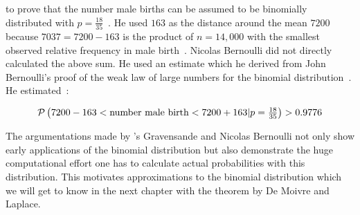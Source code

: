to prove that the number male births can be assumed to be binomially distributed with $p=\tfrac{18}{35}$~\cite[pp. 281-282]{hald1}. He used $163$ as the distance around the mean $7200$ because $7037=7200-163$ is the product of $n=14,000$ with the smallest observed relative frequency in male birth~\cite[p. 282]{hald1}. Nicolas Bernoulli did not directly calculated the above sum. He used an estimate which he derived from John Bernoulli's proof of the weak law of large numbers for the binomial distribution~\cite[pp. 264-267]{hald1}. He estimated~\cite[p. 282]{hald1}:

\begin{align}
    \P{7200-163 < \text{number male birth} < 7200+163|p=\tfrac{18}{35}} > 0.9776
\end{align}

The argumentations made by 's Gravensande and Nicolas Bernoulli not only show early applications of the binomial distribution but also demonstrate the huge computational effort one has to calculate actual probabilities with this distribution. This motivates approximations to the binomial distribution which we will get to know in the next chapter with the theorem by De Moivre and Laplace.
